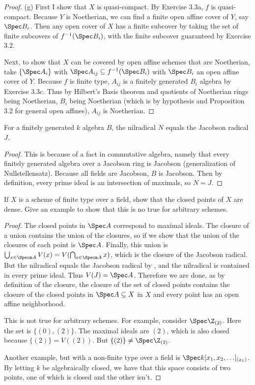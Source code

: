 \begin{proof}
	(g) First I show that $X $ is quasi-compact.
	By Exercise 3.3a, $f $ is quasi-compact.
	Because $Y $ is Noetherian, we can find a finite open affine cover of $Y $, say $\Spec B_i $.
	Then any open cover of $X $ has a finite subcover by taking the set of finite subcovers of $f^{-1}(\Spec B_i) $, with the finite subcover guaranteed by Exercise 3.2.

	Next, to show that $X $ can be covered by open affine schemes that are Noetherian, take $\{\Spec A_i\}   $ with $\Spec A_{ij} \subseteq f^{-1}(\Spec B_i) $ with $\Spec B_i $ an open affine cover of $Y $.
	Because $f $ is finite type, $A_{ij} $ is a finitely generated $B_i $ algebra by Exercise 3.3c.
	Thus by Hilbert's Basis theorem and quotients of Noetherian rings being Noetherian, $B_i $ being Noetherian (which is by hypothesis and Proposition 3.2 for general open affines), $A_{ij} $ is Noetherian.
\end{proof}

\begin{lem}\label{lem:finitetypenilradical}
	For a finitely generated $k $ algebra $B $, the nilradical $N $ equals the Jacobson radical $J $.
\end{lem}
\begin{proof}
	This is because of a fact in commutative algebra, namely that every finitely generated algebra over a Jacobson ring is Jacobson (generalization of Nullstellensatz).
	Because all fields are Jacobson, $B $ is Jacobson.
	Then by definition, every prime ideal is an intersection of maximals, so $N = J $.
\end{proof}

\begin{exercise}
	If $X $ is a scheme of finite type over a field, show that the closed points of $X $ are dense. Give an example to show that this is no true for arbitrary schemes.
\end{exercise}
\begin{proof}
	The closed points in $\Spec A $ correspond to maximal ideals.
	The closure of a union contains the union of the closures, so if we show that the union of the closures of each point is $\Spec A $.
	Finally, this union is $\bigcup_{x\in \Specm A} V(x) = V(\bigcap_{x\in \Specm A} x)$, which is the closure of the Jacobson radical.
	But the nilradical equals the Jacobson radical by , and the nilradical is contained in every prime ideal.
	Thus $V(J) = \Spec A $.
	Therefore we are done, as by definition of the closure, the closure of the set of closed points contains the closure of the closed points in $\Spec A \subseteq X $ in $X $ and every point has an open affine neighborhood.

	This is not true for arbitrary schemes.
	For example, consider $\Spec \Z_{(2)} $.
	Here the set is $\{(0),(2)\}   $.
	The maximal ideals are $(2) $, which is also closed because $\{(2)\}  = V((2))  $.
	But $\{(2)\}  \ne \Spec \Z_{(2)}$.

	Another example, but with a non-finite type over a field is $\Spec k[x_{1},x_{2},\ldots] _{(x_{1})}$.
	By letting $k $ be algebraically closed, we have that this space consists of two points, one of which is closed and the other isn't.
\end{proof}

